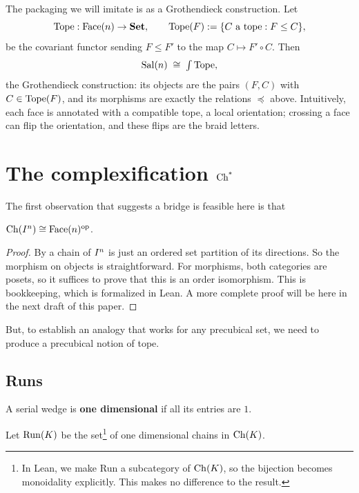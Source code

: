\documentclass[11pt]{article}
\begin{document}
The packaging we will imitate is as a Grothendieck construction. Let
\[
  \operatorname{Tope} : \operatorname{Face}(n) \to \mathbf{Set}, \qquad \operatorname{Tope}(F) := \{ C \text{ a tope} : F \leq C \},
\]
be the covariant functor sending $F \leq F'$ to the map $C \mapsto F' \circ C$. Then
\[
  \operatorname{Sal}(n) \;\cong\; \textstyle\int \operatorname{Tope},
\]
the Grothendieck construction: its objects are the pairs $(F, C)$ with $C \in \operatorname{Tope}(F)$, and its morphisms
are exactly the relations $\preceq$ above. Intuitively, each face is annotated with a compatible
tope, a local orientation; crossing a face can flip the orientation, and these flips are the braid
letters.

\section{The complexification \texorpdfstring{$\operatorname{Ch^*}$}{Ch*}}\label{sec:complexification}

The first observation that suggests a bridge is feasible here is that
\begin{lemma}\label{lem:ch-face}
  $\operatorname{Ch}(I^{n}) \cong \operatorname{Face}(n)^{\mathrm{op}}$.
\end{lemma}
\begin{proof}
By  a chain of $I^{n}$ is just an ordered set partition of its
directions. So the morphism on objects is straightforward. 
For morphisms, both categories are posets, so it suffices to prove that this is an order isomorphism.  
This is bookkeeping, which is formalized in Lean.
A more complete proof will be here in the next draft of this paper.
\end{proof}
But, to establish an analogy that works for any precubical set, we need 
to produce a precubical notion of tope. 
\subsection{Runs}

\begin{definition}
  A serial wedge is \textbf{one dimensional} if all its entries are $1$.
\end{definition}

\begin{definition}
  Let $\operatorname{Run}(K)$ be the set\footnote{In Lean, we make Run a subcategory of $\operatorname{Ch}(K)$, 
  so the bijection becomes monoidality explicitly. 
  This makes no difference to the result.} 
  of one dimensional chains in $\operatorname{Ch}(K)$.
\end{definition}
\end{document}
